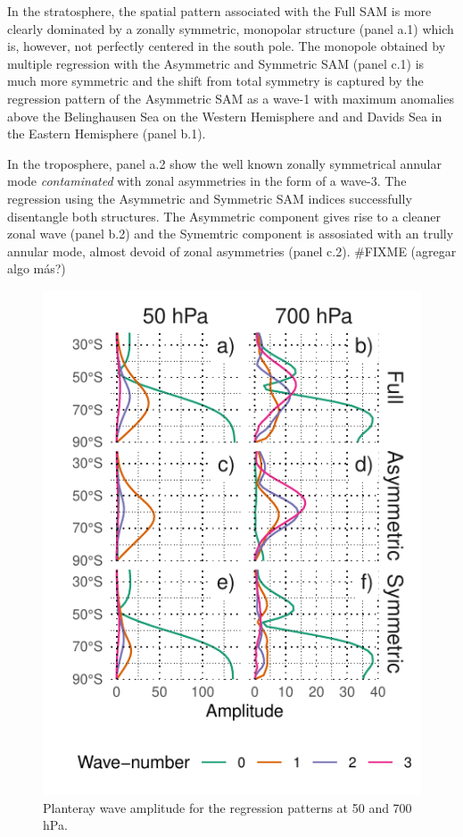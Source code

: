 \documentclass[twocol]{ametsocV5}
\begin{document}
In the stratosphere, the spatial pattern associated with the Full SAM is
more clearly dominated by a zonally symmetric, monopolar structure
(panel a.1) which is, however, not perfectly centered in the south pole.
The monopole obtained by multiple regression with the Asymmetric and
Symmetric SAM (panel c.1) is much more symmetric and the shift from
total symmetry is captured by the regression pattern of the Asymmetric
SAM as a wave-1 with maximum anomalies above the Belinghausen Sea on the
Western Hemisphere and and Davids Sea in the Eastern Hemisphere (panel
b.1).

In the troposphere, panel a.2 show the well known zonally symmetrical
annular mode \emph{contaminated} with zonal asymmetries in the form of a
wave-3. The regression using the Asymmetric and Symmetric SAM indices
successfully disentangle both structures. The Asymmetric component gives
rise to a cleaner zonal wave (panel b.2) and the Symemtric component is
assosiated with an trully annular mode, almost devoid of zonal
asymmetries (panel c.2). \#FIXME (agregar algo más?)

\begin{figure}
\includegraphics{wave-amplitude-1} \caption[Planteray wave amplitude for the regression patterns at 50 and 700 hPa]{Planteray wave amplitude for the regression patterns at 50 and 700 hPa.}\label{fig:wave-amplitude}
\end{figure}
\end{document}
